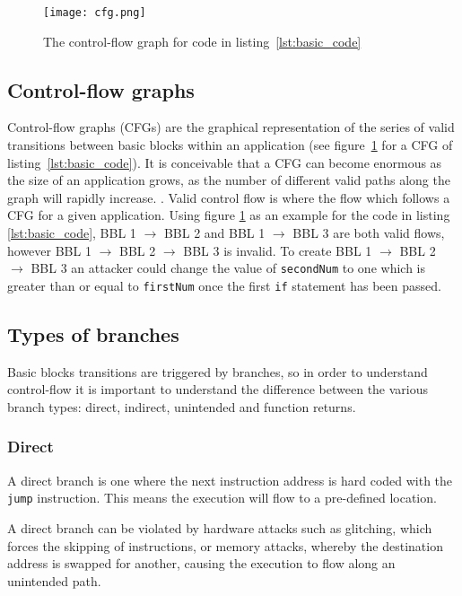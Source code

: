\begin{figure}
  \centering
  \vspace*{0.5in}
  \texttt{[image: cfg.png]}
  \caption{The control-flow graph for code in listing~\ref{lst:basic_code}}
  \label{fig:basicCFG}
\end{figure}

\subsection{Control-flow graphs}
Control-flow graphs (CFGs) are the graphical representation of the series of valid transitions between basic blocks within an application (see figure~\ref{fig:basicCFG} for a CFG of listing~\ref{lst:basic_code}). It is conceivable that a CFG can become enormous as the size of an application grows, as the number of different valid paths along the graph will rapidly increase.
\ifnotesincluded
{}
\fi. Valid control flow is where the flow which follows a CFG for a given application. Using figure \ref{fig:basicCFG} as an example for the code in listing \ref{lst:basic_code}, BBL 1 $\rightarrow$ BBL 2 and BBL 1 $\rightarrow$ BBL 3 are both valid flows, however BBL 1 $\rightarrow$ BBL 2 $\rightarrow$ BBL 3 is invalid. To create BBL 1 $\rightarrow$ BBL 2 $\rightarrow$ BBL 3 an attacker could change the value of \verb|secondNum| to one which is greater than or equal to \verb|firstNum| once the first \verb|if| statement has been passed. 

\subsection{Types of branches}
Basic blocks transitions are triggered by branches, so in order to understand control-flow it is important to understand the difference between the various branch types: direct, indirect, unintended and function returns.

\subsubsection{Direct}
A direct branch is one where the next instruction address is hard coded with the \verb|jump| instruction. This means the execution will flow to a pre-defined location.

A direct branch can be violated by hardware attacks such as glitching, which forces the skipping of instructions, or memory attacks, whereby the destination address is swapped for another, causing the execution to flow along an unintended path.

